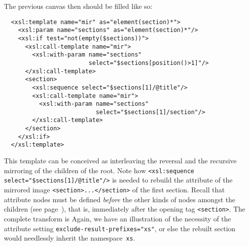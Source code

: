 The previous canvas then should be filled like so:
\begin{verbatim}
  <xsl:template name="mir" as="element(section)*">
    <xsl:param name="sections" as="element(section)*"/>
    <xsl:if test="not(empty($sections))">
      <xsl:call-template name="mir">
        <xsl:with-param name="sections"
                        select="$sections[position()>1]"/>
      </xsl:call-template>
      <section>
        <xsl:sequence select="$sections[1]/@title"/>
        <xsl:call-template name="mir">
          <xsl:with-param name="sections"
                          select="$sections[1]/section"/>
        </xsl:call-template>
      </section>
    </xsl:if>
  </xsl:template>
\end{verbatim}
This template can be conceived as interleaving the reversal and the
recursive mirroring of the children of the root. Note how
\texttt{<xsl:sequence select="\$sections[1]/@title"/>} is needed to
rebuild the attribute of the mirrored image
\texttt{<section>...</section>} of the first section. Recall that
attribute nodes must be defined \emph{before} the other kinds of nodes
amongst the children (see page~\pageref{attr_before}), that is,
immediately after the opening tag \texttt{<section>}. The complete
transform is 
\noindent Again, we have an illustration of the necessity of the
attribute setting \texttt{exclude-result-prefixes="xs"}, or else the
rebuilt section would needlessly inherit the namespace~\texttt{xs}.

